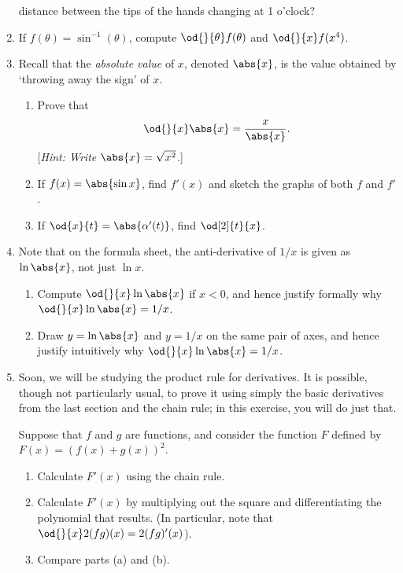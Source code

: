 \begin{enumerate}
        distance between the tips of the hands changing at 1 o'clock?
  \item If $ f(\theta) = \sin^{-1} (\theta) $, compute $ \od{}{\theta} f(\theta) $ and $ \od{}{x} f(x^4) $.
  \item Recall that the \emph{absolute value} of $ x $, denoted $ \abs{x} $, is the value obtained by `throwing away the sign' of $ x $.
    \begin{enumerate}
      \item Prove that
            \begin{displaymath}
              \od{}{x} \abs{x} = \frac{x}{\abs{x}}.
            \end{displaymath}
            [\textit{Hint: Write $ \abs{x} = \sqrt{x^2} $.}]
      \item If $ f(x) = \abs{\sin x} $, find $ f'(x) $ and sketch the graphs of both $ f $ and $ f' $.
      \item If $ \od{x}{t} = \abs{\alpha'(t)} $, find $ \od[2]{t}{x} $.
    \end{enumerate}
  \item Note that on the formula sheet, the anti-derivative of $ 1/x $ is given as $ \ln \abs{x} $, not just $ \ln x $.
    \begin{enumerate}
      \item Compute $ \od{}{x} \ln \abs{x} $ if $ x < 0 $, and hence justify formally why $ \od{}{x} \ln \abs{x} = 1/x $.
      \item Draw $ y = \ln \abs{x} $ and $ y = 1/x $ on the same pair of axes, and hence justify intuitively why $ \od{}{x} \ln \abs{x} = 1/x $.
    \end{enumerate}
  \item Soon, we will be studying the product rule for derivatives. It is possible, though not
        particularly usual, to prove it using simply the basic derivatives from the last section and the chain
        rule; in this exercise, you will do just that.

        Suppose that $ f $ and $ g $ are functions, and consider the function $ F $ defined by $ F(x) = \left(f(x) + g(x)\right)^2 $.
    \begin{enumerate}
      \item Calculate $ F'(x) $ using the chain rule.
      \item Calculate $ F'(x) $ by multiplying out the square and differentiating the polynomial that results. (In particular, note
            that $ \od{}{x} 2(fg)(x) = 2 (fg)'(x) $).
      \item Compare parts (a) and (b).
    \end{enumerate}
\end{enumerate}

